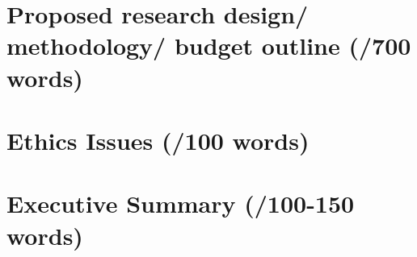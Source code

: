 \documentclass[14pt]{memoir}
\begin{document}
 






\section*{Proposed research design/ methodology/ budget outline (/700 words)}

\section*{Ethics Issues (/100 words)}

\section*{Executive Summary (/100-150 words)}



\printglossaries

\glsresetall

 
\end{document}
